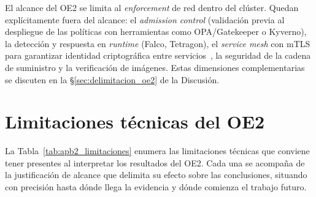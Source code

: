 El alcance del OE2 se limita al \emph{enforcement} de red dentro del clúster. Quedan explícitamente fuera del alcance: el \emph{admission control} (validación previa al despliegue de las políticas con herramientas como OPA/Gatekeeper o Kyverno), la detección y respuesta en \emph{runtime} (Falco, Tetragon), el \emph{service mesh} con mTLS para garantizar identidad criptográfica entre servicios~\cite{ref26}, la seguridad de la cadena de suministro y la verificación de imágenes. Estas dimensiones complementarias se discuten en la \S\ref{sec:delimitacion_oe2} de la Discusión.

\fi

\iffalse
\section{Limitaciones técnicas del OE2} \label{sec:apb2_limitaciones}

La Tabla~\ref{tab:apb2_limitaciones} enumera las limitaciones técnicas que conviene tener presentes al interpretar los resultados del OE2. Cada una se acompaña de la justificación de alcance que delimita su efecto sobre las conclusiones, situando con precisión hasta dónde llega la evidencia y dónde comienza el trabajo futuro.

